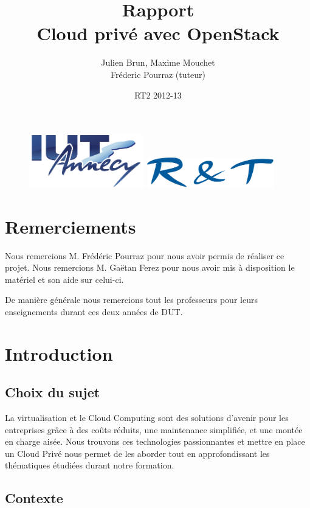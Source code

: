 \documentclass[a4paper,oneside]{report}
\title{Rapport \\ \og Cloud privé avec OpenStack \fg}
\author{Julien Brun, Maxime Mouchet \\ Fréderic Pourraz (tuteur)}
\date{RT2 2012-13}
\begin{document}
\begin{figure}
\includegraphics[width=5cm]{images/iut.png}\hfill
\includegraphics[width=5.5cm]{images/rt.png}
\end{figure}

\maketitle

\clearpage
\thispagestyle{empty}
\null\newpage

\chapter*{Remerciements}
\thispagestyle{empty}
\noindent Nous remercions M. Frédéric Pourraz pour nous avoir permis de réaliser ce projet.\newline
\noindent Nous remercions M. Gaëtan Ferez pour nous avoir mis à disposition le matériel et son aide sur celui-ci.

\noindent De manière générale nous remercions tout les professeurs pour leurs enseignements durant ces deux années de DUT.

\renewcommand{\contentsname}{Sommaire}
\setcounter{tocdepth}{1}
\tableofcontents

\chapter{Introduction}
\section{Choix du sujet}
La virtualisation et le Cloud Computing sont des solutions d'avenir pour les entreprises grâce à des coûts réduits, une maintenance simplifiée, et une montée en charge aisée.
Nous trouvons ces technologies passionnantes et mettre en place un Cloud Privé nous permet de les aborder tout en approfondissant les thématiques étudiées durant notre formation.

\section{Contexte}
\end{document}
